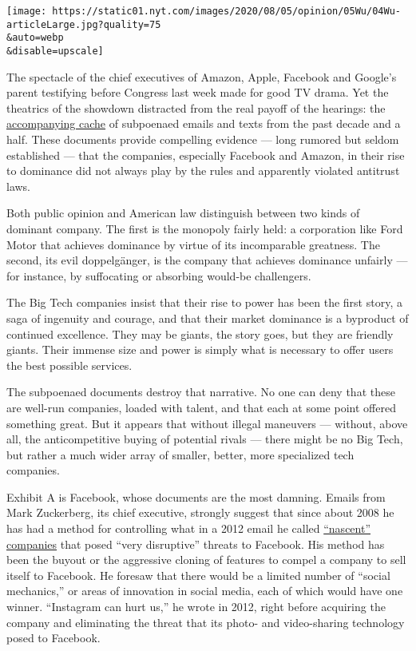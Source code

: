 \texttt{[image: https://static01.nyt.com/images/2020/08/05/opinion/05Wu/04Wu-articleLarge.jpg?quality=75\\\&auto=webp\\\&disable=upscale]}

The spectacle of the chief executives of Amazon, Apple, Facebook and
Google's parent testifying before Congress last week made for good TV
drama. Yet the theatrics of the showdown distracted from the real payoff
of the hearings: the
\href{https://judiciary.house.gov/online-platforms-and-market-power/}{accompanying
cache} of subpoenaed emails and texts from the past decade and a half.
These documents provide compelling evidence --- long rumored but seldom
established --- that the companies, especially Facebook and Amazon, in
their rise to dominance did not always play by the rules and apparently
violated antitrust laws.

Both public opinion and American law distinguish between two kinds of
dominant company. The first is the monopoly fairly held: a corporation
like Ford Motor that achieves dominance by virtue of its incomparable
greatness. The second, its evil doppelgänger, is the company that
achieves dominance unfairly --- for instance, by suffocating or
absorbing would-be challengers.

The Big Tech companies insist that their rise to power has been the
first story, a saga of ingenuity and courage, and that their market
dominance is a byproduct of continued excellence. They may be giants,
the story goes, but they are friendly giants. Their immense size and
power is simply what is necessary to offer users the best possible
services.

The subpoenaed documents destroy that narrative. No one can deny that
these are well-run companies, loaded with talent, and that each at some
point offered something great. But it appears that without illegal
maneuvers --- without, above all, the anticompetitive buying of
potential rivals --- there might be no Big Tech, but rather a much wider
array of smaller, better, more specialized tech companies.

Exhibit A is Facebook, whose documents are the most damning. Emails from
Mark Zuckerberg, its chief executive, strongly suggest that since about
2008 he has had a method for controlling what in a 2012 email he called
\href{https://papers.ssrn.com/sol3/papers.cfm?abstract_id=3624058}{``nascent''
companies} that posed ``very disruptive'' threats to Facebook. His
method has been the buyout or the aggressive cloning of features to
compel a company to sell itself to Facebook. He foresaw that there would
be a limited number of ``social mechanics,'' or areas of innovation in
social media, each of which would have one winner. ``Instagram can hurt
us,'' he wrote in 2012, right before acquiring the company and
eliminating the threat that its photo- and video-sharing technology
posed to Facebook.

